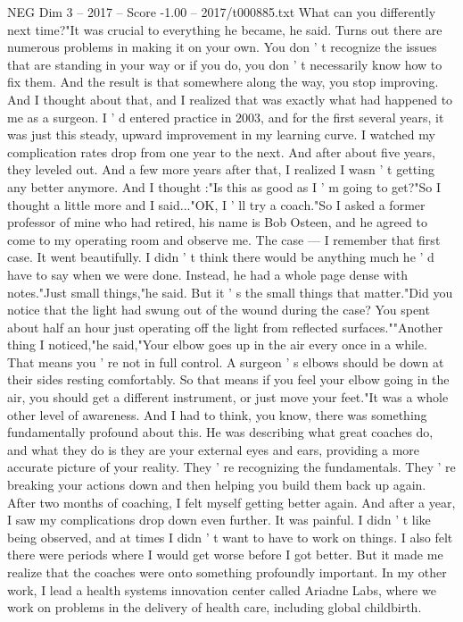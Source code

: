 \begin{textsample}{NEG Dim 3 – 2017 – Score -1.00 – 2017/t000885.txt}
What can you differently next time?"It was crucial to everything he became, he said.
Turns out there are numerous problems in making it on your own.
You don ' t recognize the issues that are standing in your way or if you do, you don ' t necessarily know how to fix them.
And the result is that somewhere along the way, you stop improving.
And I thought about that, and I realized that was exactly what had happened to me as a surgeon.
I ' d entered practice in 2003, and for the first several years, it was just this steady, upward improvement in my learning curve.
I watched my complication rates drop from one year to the next.
And after about five years, they leveled out.
And a few more years after that, I realized I wasn ' t getting any better anymore.
And I thought :"Is this as good as I ' m going to get?"So I thought a little more and I said..."OK, I ' ll try a coach."So I asked a former professor of mine who had retired, his name is Bob Osteen, and he agreed to come to my operating room and observe me.
The case — I remember that first case.
It went beautifully.
I didn ' t think there would be anything much he ' d have to say when we were done.
Instead, he had a whole page dense with notes."Just small things,"he said.
But it ' s the small things that matter."Did you notice that the light had swung out of the wound during the case?
You spent about half an hour just operating off the light from reflected surfaces.""Another thing I noticed,"he said,"Your elbow goes up in the air every once in a while.
That means you ' re not in full control.
A surgeon ' s elbows should be down at their sides resting comfortably.
So that means if you feel your elbow going in the air, you should get a different instrument, or just move your feet."It was a whole other level of awareness.
And I had to think, you know, there was something fundamentally profound about this.
He was describing what great coaches do, and what they do is they are your external eyes and ears, providing a more accurate picture of your reality.
They ' re recognizing the fundamentals.
They ' re breaking your actions down and then helping you build them back up again.
After two months of coaching, I felt myself getting better again.
And after a year, I saw my complications drop down even further.
It was painful.
I didn ' t like being observed, and at times I didn ' t want to have to work on things.
I also felt there were periods where I would get worse before I got better.
But it made me realize that the coaches were onto something profoundly important.
In my other work, I lead a health systems innovation center called Ariadne Labs, where we work on problems in the delivery of health care, including global childbirth.

\end{textsample}
